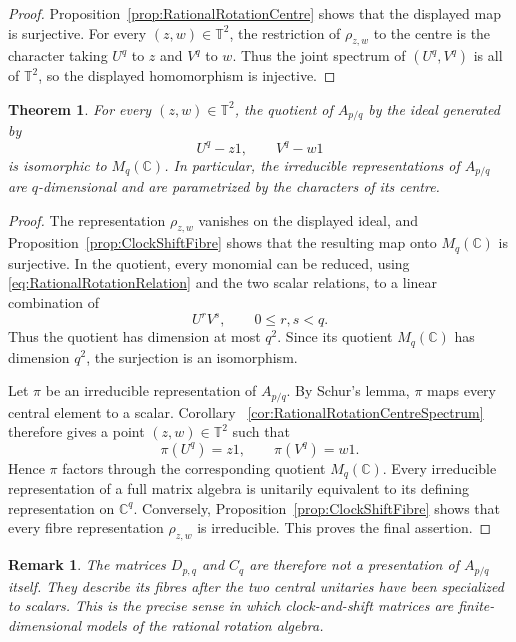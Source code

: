 \documentclass{book}
\newtheorem{remark}[definition]{Remark}
\newtheorem{theorem}[definition]{Theorem}
\begin{document}
\begin{proof}
  Proposition~\ref{prop:RationalRotationCentre} shows that the displayed
  map is surjective.  For every \((z,w)\in\mathbb T^2\), the restriction of
  \(\rho_{z,w}\) to the centre is the character taking \(U^q\) to \(z\) and
  \(V^q\) to \(w\).  Thus the joint spectrum of \((U^q,V^q)\) is all of
  \(\mathbb T^2\), so the displayed homomorphism is injective.
\end{proof}

\begin{theorem}\label{thm:RationalRotationFibres}
  For every \((z,w)\in\mathbb T^2\), the quotient of \(A_{p/q}\) by the
  ideal generated by
  \[
    U^q-z1,
    \qquad V^q-w1
  \]
  is isomorphic to \(M_q(\mathbb C)\).  In particular, the irreducible
  representations of \(A_{p/q}\) are \(q\)-dimensional and are parametrized
  by the characters of its centre.
\end{theorem}

\begin{proof}
  The representation \(\rho_{z,w}\) vanishes on the displayed ideal, and
  Proposition~\ref{prop:ClockShiftFibre} shows that the resulting map onto
  \(M_q(\mathbb C)\) is surjective.  In the quotient, every monomial can be
  reduced, using \eqref{eq:RationalRotationRelation} and the two scalar
  relations, to a linear combination of
  \[
    U^rV^s,
    \qquad 0\leq r,s<q.
  \]
  Thus the quotient has dimension at most \(q^2\).  Since its quotient
  \(M_q(\mathbb C)\) has dimension \(q^2\), the surjection is an
  isomorphism.

  Let \(\pi\) be an irreducible representation of \(A_{p/q}\).  By Schur's
  lemma, \(\pi\) maps every central element to a scalar.  Corollary~
  \ref{cor:RationalRotationCentreSpectrum} therefore gives a point
  \((z,w)\in\mathbb T^2\) such that
  \[
    \pi(U^q)=z1,
    \qquad \pi(V^q)=w1.
  \]
  Hence \(\pi\) factors through the corresponding quotient
  \(M_q(\mathbb C)\).  Every irreducible representation of a full matrix
  algebra is unitarily equivalent to its defining representation on
  \(\mathbb C^q\).  Conversely, Proposition~\ref{prop:ClockShiftFibre}
  shows that every fibre representation \(\rho_{z,w}\) is irreducible.
  This proves the final assertion.
\end{proof}

\begin{remark}
  The matrices \(D_{p,q}\) and \(C_q\) are therefore not a presentation of
  \(A_{p/q}\) itself.  They describe its fibres after the two central
  unitaries have been specialized to scalars.  This is the precise sense in
  which clock-and-shift matrices are finite-dimensional models of the
  rational rotation algebra.
\end{remark}
\end{document}
